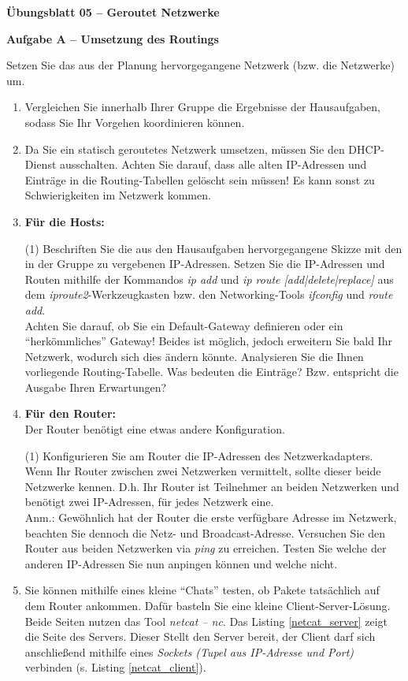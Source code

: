 \documentclass[paper=a4,fontsize=11pt]{scrartcl}%
\numberwithin{equation}{section}
\begin{document}
\begin{center}
\Large{\textbf{Übungsblatt 05 -- Geroutet Netzwerke}}
\end{center}
\begin{center}\Large{\textbf{Aufgabe A -- Umsetzung des Routings}}\end{center}\vskip0.25in
Setzen Sie das aus der Planung hervorgegangene Netzwerk (bzw. die Netzwerke) um.
\begin{enumerate}
	\item Vergleichen Sie innerhalb Ihrer Gruppe die Ergebnisse der Hausaufgaben, sodass Sie Ihr Vorgehen koordinieren können.
	\item Da Sie ein statisch geroutetes Netzwerk umsetzen, müssen Sie den DHCP-Dienst ausschalten. Achten Sie darauf, dass alle alten IP-Adressen und Einträge in die Routing-Tabellen gelöscht sein müssen! Es kann sonst zu Schwierigkeiten im Netzwerk kommen.
	\item \textbf{Für die Hosts:}\\
	\begin{tasks}(1)
		\task Beschriften Sie die aus den Hausaufgaben hervorgegangene Skizze mit den in der Gruppe zu vergebenen IP-Adressen.
		\task Setzen Sie die IP-Adressen und Routen mithilfe der Kommandos \emph{ip add} und \emph{ip route [add|delete|replace]} aus dem \emph{iproute2}-Werkzeugkasten bzw. den Networking-Tools \emph{ifconfig} und \emph{route add}.\\
		Achten Sie darauf, ob Sie ein Default-Gateway definieren oder ein \enquote{herkömmliches} Gateway! Beides ist möglich, jedoch erweitern Sie bald Ihr Netzwerk, wodurch sich dies ändern könnte.
		\task Analysieren Sie die Ihnen vorliegende Routing-Tabelle. Was bedeuten die Einträge? Bzw. entspricht die Ausgabe Ihren Erwartungen?
	\end{tasks}
	\item \textbf{Für den Router:}\\
	Der Router benötigt eine etwas andere Konfiguration. 
	\begin{tasks}(1)
		\task Konfigurieren Sie am Router die IP-Adressen des Netzwerkadapters. Wenn Ihr Router zwischen zwei Netzwerken vermittelt, sollte dieser beide Netzwerke kennen. D.h. Ihr Router ist Teilnehmer an beiden Netzwerken und benötigt zwei IP-Adressen, für jedes Netzwerk eine.\\
		Anm.: Gewöhnlich hat der Router die erste verfügbare Adresse im Netzwerk, beachten Sie dennoch die Netz- und Broadcast-Adresse.
		\task Versuchen Sie den Router aus beiden Netzwerken via \emph{ping} zu erreichen.
		\task Testen Sie welche der anderen IP-Adressen Sie nun anpingen können und welche nicht.
	\end{tasks}
	\item Sie können mithilfe eines kleine \enquote{Chats} testen, ob Pakete tatsächlich auf dem Router ankommen. Dafür basteln Sie eine kleine  Client-Server-Lösung. Beide Seiten nutzen das Tool \emph{netcat -- \emph{nc}}. Das Listing \ref{netcat_server} zeigt die Seite des Servers. Dieser Stellt den Server bereit, der Client darf sich anschließend mithilfe eines \emph{Sockets (Tupel aus IP-Adresse und Port)} verbinden (s. Listing \ref{netcat_client}). 
		

\end{enumerate}
\end{document}
